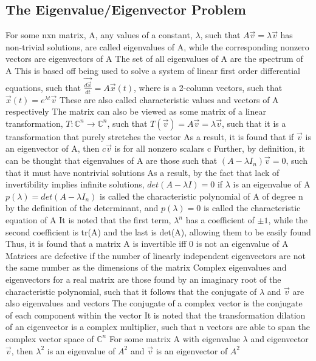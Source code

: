 \documentclass[11 pt, twoside]{article}
\newenvironment{outline*}
{
	\begin{outline}[enumerate]
	}
	{\end{outline}
}
\begin{document}
\subsection{The Eigenvalue/Eigenvector Problem}
\begin{outline*}
\1 For some nxn matrix, A, any values of a constant, $\lambda$, such that $A\vec{v} = \lambda\vec{v}$ has non-trivial solutions, are called eigenvalues of A, while the corresponding nonzero vectors are eigenvectors of A
\2 The set of all eigenvalues of A are the spectrum of A
\2 This is based off being used to solve a system of linear first order differential equations, such that $\vec{\frac{d\vec{x}}{dt}} = A\vec{x}(t)$, where  is a 2-column vectors, such that $\vec{x}(t) = e^{\lambda t}\vec{v}$
\2 These are also called characteristic values and vectors of A respectively
\2 The matrix can also be viewed as some matrix of a linear transformation, $T: \mathbb{C}^n \to \mathbb{C}^n$, such that $T(\vec{v}) = A\vec{v} = \lambda \vec{v}$, such that it is a transformation that purely stretches the vector
\3 As a result, it is found that if $\vec{v}$ is an eigenvector of A, then $c\vec{v}$ is for all nonzero scalars c
\2 Further, by definition, it can be thought that eigenvalues of A are those such that $(A - \lambda I_n)\vec{v} = 0$, such that it must have nontrivial solutions
\3 As a result, by the fact that lack of invertibility implies infinite solutions, $det(A - \lambda I) = 0$ if $\lambda$ is an eigenvalue of A
\3 $p(\lambda) = det(A - \lambda I_n)$ is called the characteristic polynomial of A of degree n by the definition of the determinant, and $p(\lambda) = 0$ is called the characteristic equation of A
\4 It is noted that the first term, $\lambda^n$ has a coefficient of $\pm 1$, while the second coefficient is tr(A) and the last is det(A), allowing them to be easily found
\3 Thus, it is found that a matrix A is invertible iff 0 is not an eigenvalue of A
\2 Matrices are defective if the number of linearly independent eigenvectors are not the same number as the dimensions of the matrix
\2 Complex eigenvalues and eigenvectors for a real matrix are those found by an imaginary root of the characteristic polynomial, such that it follows that the conjugate of $\lambda$ and $\vec{v}$ are also eigenvalues and vectors
\3 The conjugate of a complex vector is the conjugate of each component within the vector
\3 It is noted that the transformation dilation of an eigenvector is a complex multiplier, such that n vectors are able to span the complex vector space of $\mathbb{C}^n$
\2 For some matrix A with eigenvalue $\lambda$ and eigenvector $\vec{v}$, then $\lambda^2$ is an eigenvalue of $A^2$ and $\vec{v}$ is an eigenvector of $A^2$

\end{outline*}
\end{document}
